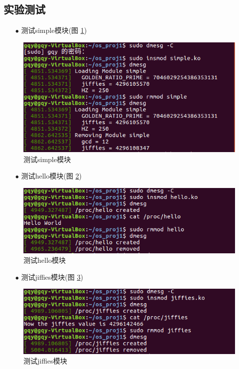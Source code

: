\documentclass{article}
\begin{document}
\subsection{实验测试}
\begin{itemize}
\item[$\bullet$]测试simple模块(图 \ref{测试simple模块})
\end{itemize}
\begin{figure}[htbp]
		\centering
		\includegraphics{simple}
		\caption{测试simple模块} \label{测试simple模块}
\end{figure}
\begin{itemize}
\item[$\bullet$]测试hello模块(图 \ref{测试hello模块})
\end{itemize}
\begin{figure}[htbp]
		\centering
		\includegraphics{hello}
		\caption{测试hello模块} \label{测试hello模块}
\end{figure}
\begin{itemize}
\item[$\bullet$]测试jiffies模块(图 \ref{测试jiffies模块})
\end{itemize}
\begin{figure}[htbp]
		\centering
		\includegraphics{jiffies}
		\caption{测试jiffies模块} \label{测试jiffies模块}
\end{figure}
\end{document}
